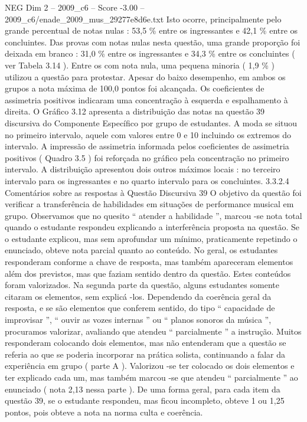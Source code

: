 \begin{textsample}{NEG Dim 2 – 2009\_c6 – Score -3.00 – 2009\_c6/enade\_2009\_mus\_29277e8d6e.txt}
Isto ocorre, principalmente pelo grande percentual de notas nulas : 53,5 \% entre os ingressantes e 42,1 \% entre os concluintes.
Das provas com notas nulas nesta questão, uma grande proporção foi deixada em branco : 31,0 \% entre os ingressantes e 34,3 \% entre os concluintes ( ver Tabela 3.14 ).
Entre os com nota nula, uma pequena minoria ( 1,9 \% ) utilizou a questão para protestar.
Apesar do baixo desempenho, em ambos os grupos a nota máxima de 100,0 pontos foi alcançada.
Os coeficientes de assimetria positivos indicaram uma concentração à esquerda e espalhamento à direita.
O Gráfico 3.12 apresenta a distribuição das notas na questão 39 discursiva do Componente Específico por grupo de estudantes.
A moda se situou no primeiro intervalo, aquele com valores entre 0 e 10 incluindo os extremos do intervalo.
A impressão de assimetria informada pelos coeficientes de assimetria positivos ( Quadro 3.5 ) foi reforçada no gráfico pela concentração no primeiro intervalo.
A distribuição apresentou dois outros máximos locais : no terceiro intervalo para os ingressantes e no quarto intervalo para os concluintes. 3.3.2.4 Comentários sobre as respostas à Questão Discursiva 39 O objetivo da questão foi verificar a transferência de habilidades em situações de performance musical em grupo.
Observamos que no quesito “ atender a habilidade ”, marcou -se nota total quando o estudante respondeu explicando a interferência proposta na questão.
Se o estudante explicou, mas sem aprofundar um mínimo, praticamente repetindo o enunciado, obteve nota parcial quanto ao conteúdo.
No geral, os estudantes responderam conforme a chave de resposta, mas também apareceram elementos além dos previstos, mas que faziam sentido dentro da questão.
Estes conteúdos foram valorizados.
Na segunda parte da questão, alguns estudantes somente citaram os elementos, sem explicá -los.
Dependendo da coerência geral da resposta, e se são elementos que conferem sentido, do tipo “ capacidade de improvisar ”, “ ouvir as vozes internas ” ou “ planos sonoros da música ”, procuramos valorizar, avaliando que atendeu “ parcialmente ” a instrução.
Muitos responderam colocando dois elementos, mas não entenderam que a questão se referia ao que se poderia incorporar na prática solista, continuando a falar da experiência em grupo ( parte A ).
Valorizou -se ter colocado os dois elementos e ter explicado cada um, mas também marcou -se que atendeu “ parcialmente ” ao enunciado ( nota 2,13 nessa parte ).
De uma forma geral, para cada item da questão 39, se o estudante respondeu, mas ficou incompleto, obteve 1 ou 1,25 pontos, pois obteve a nota na norma culta e coerência.

\end{textsample}
